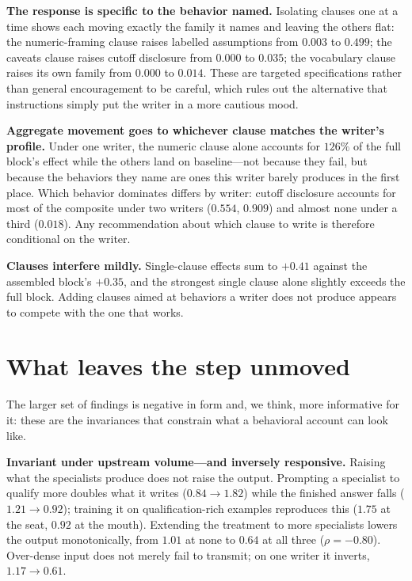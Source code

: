 \documentclass[11pt]{article}
\begin{document}
\textbf{The response is specific to the behavior named.} Isolating clauses one
at a time shows each moving exactly the family it names and leaving the others
flat: the numeric-framing clause raises labelled assumptions from $0.003$ to
$0.499$; the caveats clause raises cutoff disclosure from $0.000$ to $0.035$;
the vocabulary clause raises its own family from $0.000$ to $0.014$. These are
targeted specifications rather than general encouragement to be careful, which
rules out the alternative that instructions simply put the writer in a more
cautious mood.

\textbf{Aggregate movement goes to whichever clause matches the writer's
profile.} Under one writer, the numeric clause alone accounts for $126\%$ of
the full block's effect while the others land on baseline---not because they
fail, but because the behaviors they name are ones this writer barely produces
in the first place. Which behavior dominates differs by writer: cutoff
disclosure accounts for most of the composite under two writers ($0.554$,
$0.909$) and almost none under a third ($0.018$). Any recommendation about
which clause to write is therefore conditional on the writer.

\textbf{Clauses interfere mildly.} Single-clause effects sum to $+0.41$
against the assembled block's $+0.35$, and the strongest single clause alone
slightly exceeds the full block. Adding clauses aimed at behaviors a writer
does not produce appears to compete with the one that works.

\section{What leaves the step unmoved}
\label{sec:inv}
The larger set of findings is negative in form and, we think, more informative
for it: these are the invariances that constrain what a behavioral account can
look like.

\textbf{Invariant under upstream volume---and inversely responsive.} Raising
what the specialists produce does not raise the output. Prompting a specialist
to qualify more doubles what it writes ($0.84 \rightarrow 1.82$) while the
finished answer falls ($1.21 \rightarrow 0.92$); training it on
qualification-rich examples reproduces this ($1.75$ at the seat, $0.92$ at the
mouth). Extending the treatment to more specialists lowers the output
monotonically, from $1.01$ at none to $0.64$ at all three ($\rho = -0.80$).
Over-dense input does not merely fail to transmit; on one writer it inverts,
$1.17 \rightarrow 0.61$.
\end{document}
